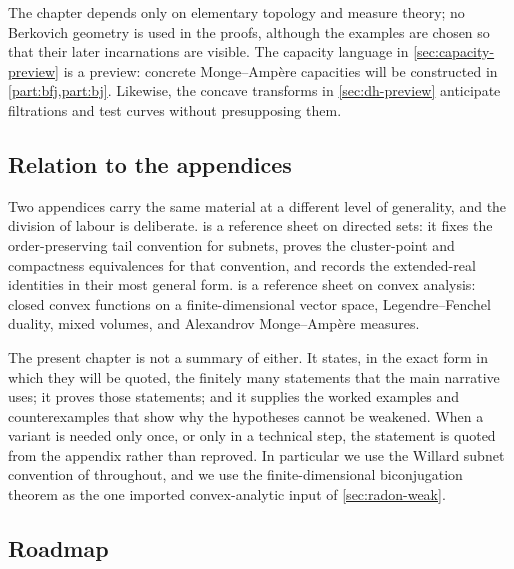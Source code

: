 The chapter depends only on elementary topology and measure theory; no
Berkovich geometry is used in the proofs, although the examples are chosen so
that their later incarnations are visible.  The
capacity language in \cref{sec:capacity-preview} is a preview: concrete
Monge--Amp\`ere capacities will be constructed in
\cref{part:bfj,part:bj}.  Likewise,
the concave transforms in \cref{sec:dh-preview} anticipate filtrations and
test curves without presupposing them.

\subsection*{Relation to the appendices}

Two appendices carry the same material at a different level of generality, and
the division of labour is deliberate.
 is a reference sheet on directed sets: it fixes the
order-preserving tail convention for subnets, proves the cluster-point and
compactness equivalences for that convention, and records the extended-real
identities in their most general form.
 is a reference sheet on convex analysis: closed convex
functions on a finite-dimensional vector space, Legendre--Fenchel duality,
mixed volumes, and Alexandrov Monge--Amp\`ere measures.

The present chapter is not a summary of either.  It states, in the exact form
in which they will be quoted, the finitely many statements that the main
narrative uses; it proves those statements; and it supplies the worked
examples and counterexamples that show why the hypotheses cannot be weakened.
When a variant is needed only once, or only in a technical step, the
statement is quoted from the appendix rather than reproved.  In particular we
use the Willard subnet convention of 
throughout, and we use the finite-dimensional biconjugation theorem
 as the one imported convex-analytic input of
\cref{sec:radon-weak}.

\subsection*{Roadmap}

